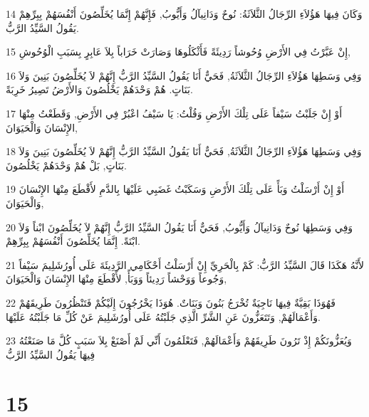 \par 14 وَكَانَ فِيهَا هَؤُلاَءِ الرِّجَالُ الثَّلاَثَةُ: نُوحٌ وَدَانِيآلُ وَأَيُّوبُ, فَإِنَّهُمْ إِنَّمَا يُخَلِّصُونَ أَنْفُسَهُمْ بِبِرِّهِمْ يَقُولُ السَّيِّدُ الرَّبُّ.
\par 15 إِنْ عَبَّرْتُ فِي الأَرْضِ وُحُوشاً رَدِيئَةً فَأَثْكَلُوهَا وَصَارَتْ خَرَاباً بِلاَ عَابِرٍ بِسَبَبِ الْوُحُوشِ,
\par 16 وَفِي وَسَطِهَا هَؤُلاَءِ الرِّجَالُ الثَّلاَثَةُ, فَحَيٌّ أَنَا يَقُولُ السَّيِّدُ الرَّبُّ إِنَّهُمْ لاَ يُخَلِّصُونَ بَنِينَ وَلاَ بَنَاتٍ. هُمْ وَحْدَهُمْ يَخْلُصُونَ وَالأَرْضُ تَصِيرُ خَرِبَةً.
\par 17 أَوْ إِنْ جَلَبْتُ سَيْفاً عَلَى تِلْكَ الأَرْضِ وَقُلْتُ: يَا سَيْفُ اعْبُرْ فِي الأَرْضِ, وَقَطَعْتُ مِنْهَا الإِنْسَانَ وَالْحَيَوَانَ,
\par 18 وَفِي وَسَطِهَا هَؤُلاَءِ الرِّجَالُ الثَّلاَثَةُ, فَحَيٌّ أَنَا يَقُولُ السَّيِّدُ الرَّبُّ إِنَّهُمْ لاَ يُخَلِّصُونَ بَنِينَ وَلاَ بَنَاتٍ, بَلْ هُمْ وَحْدَهُمْ يَخْلُصُونَ.
\par 19 أَوْ إِنْ أَرْسَلْتُ وَبَأً عَلَى تِلْكَ الأَرْضِ وَسَكَبْتُ غَضَبِي عَلَيْهَا بِالدَّمِ لأَقْطَعَ مِنْهَا الإِنْسَانَ وَالْحَيَوَانَ,
\par 20 وَفِي وَسَطِهَا نُوحٌ وَدَانِيآلُ وَأَيُّوبُ, فَحَيٌّ أَنَا يَقُولُ السَّيِّدُ الرَّبُّ إِنَّهُمْ لاَ يُخَلِّصُونَ ابْناً وَلاَ ابْنَةً. إِنَّمَا يُخَلِّصُونَ أَنْفُسَهُمْ بِبِرِّهِمْ.
\par 21 لأَنَّهُ هَكَذَا قَالَ السَّيِّدُ الرَّبُّ: كَمْ بِالْحَرِيِّ إِنْ أَرْسَلْتُ أَحْكَامِي الرَّدِيئَةَ عَلَى أُورُشَلِيمَ سَيْفاً وَجُوعاً وَوَحْشاً رَدِيئاً وَوَبَأً, لأَقْطَعَ مِنْهَا الإِنْسَانَ وَالْحَيَوَانَ,
\par 22 فَهُوَذَا بَقِيَّةٌ فِيهَا نَاجِيَةٌ تُخْرَجُ بَنُونَ وَبَنَاتٌ. هُوَذَا يَخْرُجُونَ إِلَيْكُمْ فَتَنْظُرُونَ طَرِيقَهُمْ وَأَعْمَالَهُمْ, وَتَتَعَزُّونَ عَنِ الشَّرِّ الَّذِي جَلَبْتُهُ عَلَى أُورُشَلِيمَ عَنْ كُلِّ مَا جَلَبْتُهُ عَلَيْهَا.
\par 23 وَيُعَزُّونَكُمْ إِذْ تَرُونَ طَرِيقَهُمْ وَأَعْمَالَهُمْ, فَتَعْلَمُونَ أَنِّي لَمْ أَصْنَعْ بِلاَ سَبَبٍ كُلَّ مَا صَنَعْتُهُ فِيهَا يَقُولُ السَّيِّدُ الرَّبُّ

\chapter{15}

